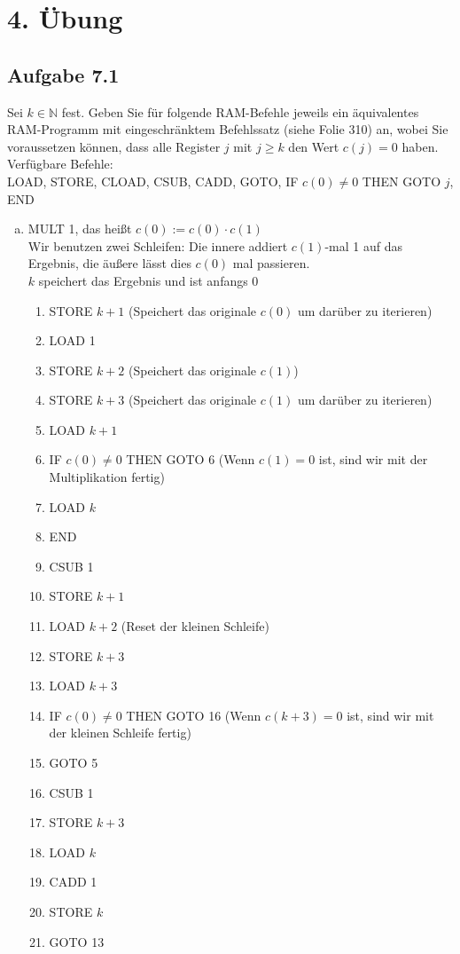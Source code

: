 \section*{4. Übung}
\subsection*{Aufgabe 7.1}
Sei $k \in \mathbb{N}$ fest. Geben Sie für folgende RAM-Befehle jeweils ein äquivalentes RAM-Programm mit eingeschränktem Befehlssatz (siehe Folie 310) an, wobei Sie voraussetzen können, dass alle Register $j$ mit $j \ge k$ den Wert $c(j) = 0$ haben.\\
Verfügbare Befehle:\\
LOAD, STORE, CLOAD, CSUB, CADD, GOTO, IF $c(0) \neq 0$ THEN GOTO $j$, END
\begin{enumerate}[(a)]
	\item MULT 1, das heißt $c(0) := c(0) \cdot c(1)$\\
	Wir benutzen zwei Schleifen: Die innere addiert $c(1)$-mal 1 auf das Ergebnis, die äußere lässt dies $c(0)$ mal passieren.\\
	$k$ speichert das Ergebnis und ist anfangs 0
	\begin{enumerate}[1.]
		\item STORE $k+1$	 (Speichert das originale $c(0)$ um darüber zu iterieren)
		\item LOAD 1
		\item STORE $k+2$	 (Speichert das originale $c(1)$)
		\item STORE $k+3$	 (Speichert das originale $c(1)$ um darüber zu iterieren)
		\item LOAD $k+1$
		\item IF $c(0) \neq 0$ THEN GOTO 6	 (Wenn $c(1) = 0$ ist, sind wir mit der Multiplikation fertig)
		\item LOAD $k$
		\item END
		\item CSUB 1
		\item STORE $k+1$ 
		\item LOAD $k+2$	(Reset der kleinen Schleife)
		\item STORE $k+3$
		\item LOAD $k+3$
		\item IF $c(0) \neq 0$ THEN GOTO 16	(Wenn $c(k+3) = 0$ ist, sind wir mit der kleinen Schleife fertig)
		\item GOTO 5
		\item CSUB 1
		\item STORE $k+3$
		\item LOAD $k$
		\item CADD 1
		\item STORE $k$
		\item GOTO 13
	\end{enumerate}
	

\end{enumerate}
